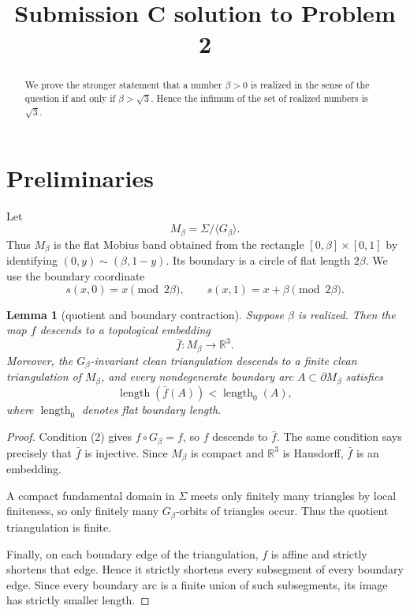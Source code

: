 \documentclass[11pt]{article}
\newtheorem{lemma}[theorem]{Lemma}
\newcommand{\R}{\mathbb R}
\newcommand{\len}{\operatorname{length}}
\begin{document}
\title{Submission C solution to Problem 2}
\date{}
\maketitle

\begin{abstract}
We prove the stronger statement that a number \(\beta>0\) is realized in the sense of the question if and only if \(\beta>\sqrt 3\).  Hence the infimum of the set of realized numbers is \(\sqrt 3\).
\end{abstract}

\section{Preliminaries}

Let
\[
M_\beta=\Sigma/\langle G_\beta\rangle .
\]
Thus \(M_\beta\) is the flat Mobius band obtained from the rectangle
\([0,\beta]\times[0,1]\) by identifying \((0,y)\sim(\beta,1-y)\).  Its boundary is a circle of flat length \(2\beta\).  We use the boundary coordinate
\[
s(x,0)=x\pmod {2\beta},\qquad s(x,1)=x+\beta\pmod {2\beta}.
\]

\begin{lemma}[quotient and boundary contraction]
Suppose \(\beta\) is realized.  Then the map \(f\) descends to a topological embedding
\[
\bar f:M_\beta\longrightarrow \R^3 .
\]
Moreover, the \(G_\beta\)-invariant clean triangulation descends to a finite clean triangulation of \(M_\beta\), and every nondegenerate boundary arc \(A\subset \partial M_\beta\) satisfies
\[
\len(\bar f(A))<\len_0(A),
\]
where \(\len_0\) denotes flat boundary length.
\end{lemma}

\begin{proof}
Condition (2) gives \(f\circ G_\beta=f\), so \(f\) descends to \(\bar f\).  The same condition says precisely that \(\bar f\) is injective.  Since \(M_\beta\) is compact and \(\R^3\) is Hausdorff, \(\bar f\) is an embedding.

A compact fundamental domain in \(\Sigma\) meets only finitely many triangles by local finiteness, so only finitely many \(G_\beta\)-orbits of triangles occur.  Thus the quotient triangulation is finite.

Finally, on each boundary edge of the triangulation, \(f\) is affine and strictly shortens that edge.  Hence it strictly shortens every subsegment of every boundary edge.  Since every boundary arc is a finite union of such subsegments, its image has strictly smaller length.
\end{proof}
\end{document}
